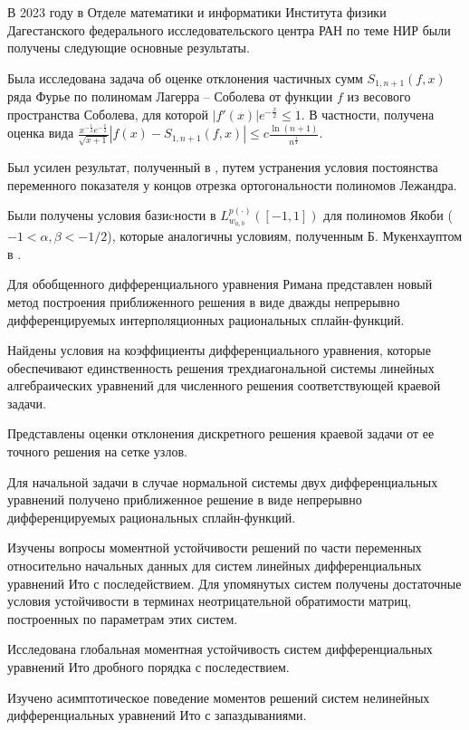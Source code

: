 В 2023 году в Отделе математики и информатики Института физики Дагестанского федерального исследовательского центра РАН по теме НИР были получены следующие основные результаты.

Была исследована задача об оценке отклонения частичных сумм $S_{1,n+1}(f,x)$ ряда Фурье по полиномам Лагерра -- Соболева от функции $f$ из весового пространства Соболева, для которой \linebreak $|f'(x)|e^{-\frac x2}\le 1$.
В частности, получена оценка вида $\frac{x^{-\frac14}e^{-\frac x2}}{\sqrt{x+1}}|f(x)-S_{1,n+1}(f,x)|\le c
\frac{\ln(n+1)}{n^{\frac14}}.$

Был усилен результат, полученный в \cite{tad-SHII-Leg}, путем устранения условия постоянства переменного показателя у концов отрезка ортогональности полиномов Лежандра.

Были получены условия базиcности в $L^{p(\cdot)}_{w_{a,b}}([-1,1])$ для полиномов Якоби ($-1<\alpha,\beta<-1/2$), которые аналогичны условиям, полученным Б. Мукенхауптом в \cite{tad-Muckenhoupt}. 

Для обобщенного дифференциального уравнения Римана представлен новый метод 
построения приближенного решения в виде дважды непрерывно
дифференцируемых интерполяционных рациональных сплайн-функций. 

Найдены условия на коэффициенты дифференциального уравнения, которые обеспечивают
единственность решения трехдиагональной системы линейных алгебраических уравнений
для численного решения соответствующей краевой задачи. 

Представлены оценки отклонения дискретного решения краевой задачи от ее точного 
решения на сетке узлов. 

Для начальной задачи в случае нормальной системы двух дифференциальных уравнений 
получено  приближенное решение в виде непрерывно дифференцируемых рациональных 
сплайн-функ\-ций. 

Изучены вопросы моментной устойчивости решений по части
переменных относительно начальных данных для систем линейных
дифференциальных уравнений Ито с последействием. Для упомянутых систем получены достаточные условия
устойчивости в терминах неотрицательной обратимости матриц,
построенных по параметрам этих систем. 

Исследована глобальная моментная устойчивость систем
дифференциальных уравнений Ито дробного порядка с последествием. 

Изучено  асимптотическое поведение моментов решений систем
нелинейных дифференциальных уравнений Ито с запаздываниями. 

